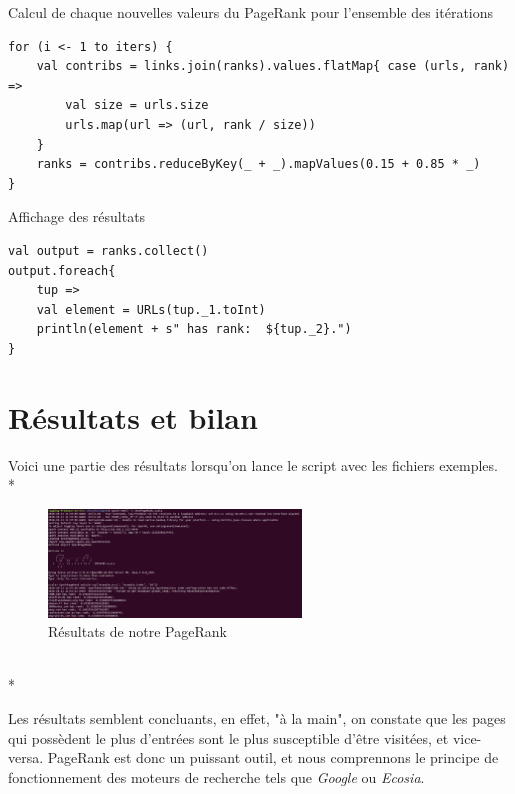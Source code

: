 \documentclass{article}
\begin{document}
\begin{enumerate}
\begin{item}
\begin{tcolorbox}
\begin{lstlisting}[style=Scala]
\end{lstlisting}
\end{tcolorbox}
\end{item}
\begin{item}
Calcul de chaque nouvelles valeurs du PageRank pour l'ensemble des it\'{e}rations
\begin{tcolorbox}
\begin{lstlisting}[style=Scala]
for (i <- 1 to iters) {
	val contribs = links.join(ranks).values.flatMap{ case (urls, rank) =>
		val size = urls.size
		urls.map(url => (url, rank / size))
	}
	ranks = contribs.reduceByKey(_ + _).mapValues(0.15 + 0.85 * _)
}
\end{lstlisting}
\end{tcolorbox}
\end{item}
\begin{item}
Affichage des r\'{e}sultats
\begin{tcolorbox}
\begin{lstlisting}[style=Scala]
val output = ranks.collect()
output.foreach{
	tup =>
	val element = URLs(tup._1.toInt)
	println(element + s" has rank:  ${tup._2}.")
}
\end{lstlisting}
\end{tcolorbox}
\end{item}
\end{enumerate}


\section{R\'{e}sultats et bilan}

Voici une partie des r\'{e}sultats lorsqu'on lance le script avec les fichiers exemples. \\*

\begin{figure}[h]
\begin{center}
\includegraphics[width=0.60\textwidth]{results}
\caption{R\'{e}sultats de notre PageRank}
\label{fig:results}
\end{center}
\end{figure}
~\\*

Les r\'{e}sultats semblent concluants, en effet, "\`{a} la main", on constate que les pages qui poss\`{e}dent le plus d'entr\'{e}es sont le plus susceptible d'\^{e}tre visit\'{e}es, et vice-versa. PageRank est donc un puissant outil, et nous comprennons le principe de fonctionnement des moteurs de recherche tels que \textit{Google} ou \textit{Ecosia}.
\end{document}
